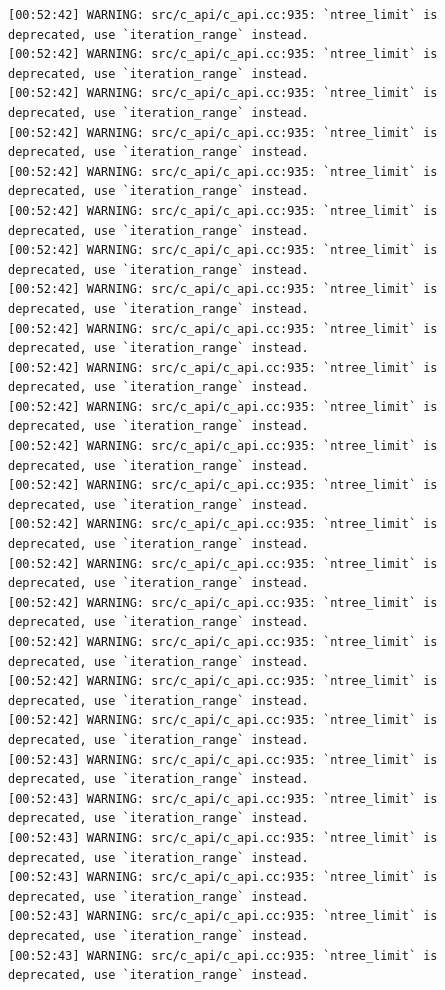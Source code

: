 \documentclass[
  letterpaper,
  DIV=11,
  numbers=noendperiod]{scrartcl}
\begin{document}
\begin{verbatim}
[00:52:42] WARNING: src/c_api/c_api.cc:935: `ntree_limit` is deprecated, use `iteration_range` instead.
[00:52:42] WARNING: src/c_api/c_api.cc:935: `ntree_limit` is deprecated, use `iteration_range` instead.
[00:52:42] WARNING: src/c_api/c_api.cc:935: `ntree_limit` is deprecated, use `iteration_range` instead.
[00:52:42] WARNING: src/c_api/c_api.cc:935: `ntree_limit` is deprecated, use `iteration_range` instead.
[00:52:42] WARNING: src/c_api/c_api.cc:935: `ntree_limit` is deprecated, use `iteration_range` instead.
[00:52:42] WARNING: src/c_api/c_api.cc:935: `ntree_limit` is deprecated, use `iteration_range` instead.
[00:52:42] WARNING: src/c_api/c_api.cc:935: `ntree_limit` is deprecated, use `iteration_range` instead.
[00:52:42] WARNING: src/c_api/c_api.cc:935: `ntree_limit` is deprecated, use `iteration_range` instead.
[00:52:42] WARNING: src/c_api/c_api.cc:935: `ntree_limit` is deprecated, use `iteration_range` instead.
[00:52:42] WARNING: src/c_api/c_api.cc:935: `ntree_limit` is deprecated, use `iteration_range` instead.
[00:52:42] WARNING: src/c_api/c_api.cc:935: `ntree_limit` is deprecated, use `iteration_range` instead.
[00:52:42] WARNING: src/c_api/c_api.cc:935: `ntree_limit` is deprecated, use `iteration_range` instead.
[00:52:42] WARNING: src/c_api/c_api.cc:935: `ntree_limit` is deprecated, use `iteration_range` instead.
[00:52:42] WARNING: src/c_api/c_api.cc:935: `ntree_limit` is deprecated, use `iteration_range` instead.
[00:52:42] WARNING: src/c_api/c_api.cc:935: `ntree_limit` is deprecated, use `iteration_range` instead.
[00:52:42] WARNING: src/c_api/c_api.cc:935: `ntree_limit` is deprecated, use `iteration_range` instead.
[00:52:42] WARNING: src/c_api/c_api.cc:935: `ntree_limit` is deprecated, use `iteration_range` instead.
[00:52:42] WARNING: src/c_api/c_api.cc:935: `ntree_limit` is deprecated, use `iteration_range` instead.
[00:52:42] WARNING: src/c_api/c_api.cc:935: `ntree_limit` is deprecated, use `iteration_range` instead.
[00:52:43] WARNING: src/c_api/c_api.cc:935: `ntree_limit` is deprecated, use `iteration_range` instead.
[00:52:43] WARNING: src/c_api/c_api.cc:935: `ntree_limit` is deprecated, use `iteration_range` instead.
[00:52:43] WARNING: src/c_api/c_api.cc:935: `ntree_limit` is deprecated, use `iteration_range` instead.
[00:52:43] WARNING: src/c_api/c_api.cc:935: `ntree_limit` is deprecated, use `iteration_range` instead.
[00:52:43] WARNING: src/c_api/c_api.cc:935: `ntree_limit` is deprecated, use `iteration_range` instead.
[00:52:43] WARNING: src/c_api/c_api.cc:935: `ntree_limit` is deprecated, use `iteration_range` instead.

\end{verbatim}
\end{document}
